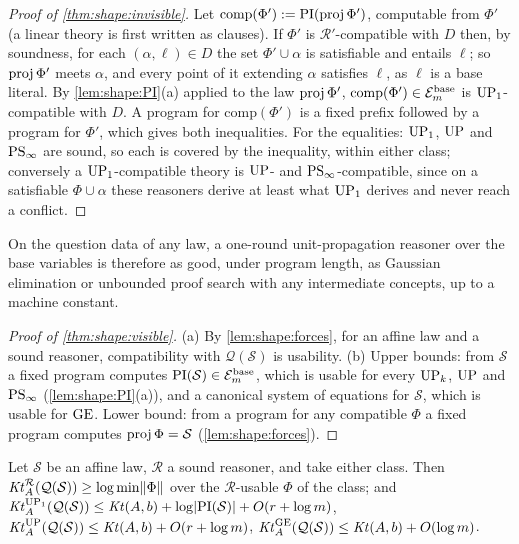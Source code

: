 \begin{proof}[Proof of \cref{thm:shape:invisible}]
Let $\mathrm{comp}(\Phi'):=\mathrm{PI}(\operatorname{proj}\Phi')$, computable from $\Phi'$ (a linear theory is first written as clauses). If $\Phi'$ is $\mathcal R'$-compatible with $D$ then, by soundness, for each $(\alpha,\ell)\in D$ the set $\Phi'\cup\alpha$ is satisfiable and entails $\ell$; so $\operatorname{proj}\Phi'$ meets $\alpha$, and every point of it extending $\alpha$ satisfies $\ell$, as $\ell$ is a base literal. By \cref{lem:shape:PI}(a) applied to the law $\operatorname{proj}\Phi'$, $\mathrm{comp}(\Phi')\in\mathcal E^{\rm base}_m$ is $\mathrm{UP}_1$-compatible with $D$. A program for $\mathrm{comp}(\Phi')$ is a fixed prefix followed by a program for $\Phi'$, which gives both inequalities. For the equalities: $\mathrm{UP}_1$, $\mathrm{UP}$ and $\mathrm{PS}_\infty$ are sound, so each is covered by the inequality, within either class; conversely a $\mathrm{UP}_1$-compatible theory is $\mathrm{UP}$- and $\mathrm{PS}_\infty$-compatible, since on a satisfiable $\Phi\cup\alpha$ these reasoners derive at least what $\mathrm{UP}_1$ derives and never reach a conflict.
\end{proof}

On the question data of any law, a one-round unit-propagation reasoner over the base variables is therefore as good, under program length, as Gaussian elimination or unbounded proof search with any intermediate concepts, up to a machine constant.

\begin{proof}[Proof of \cref{thm:shape:visible}]
(a) By \cref{lem:shape:forces}, for an affine law and a sound reasoner, compatibility with $\mathcal Q(\mathcal S)$ is usability.
(b) Upper bounds: from $\mathcal S$ a fixed program computes $\mathrm{PI}(\mathcal S)\in\mathcal E^{\rm base}_m$, which is usable for every $\mathrm{UP}_k$, $\mathrm{UP}$ and $\mathrm{PS}_\infty$ (\cref{lem:shape:PI}(a)), and a canonical system of equations for $\mathcal S$, which is usable for $\mathrm{GE}$. Lower bound: from a program for any compatible $\Phi$ a fixed program computes $\operatorname{proj}\Phi=\mathcal S$ (\cref{lem:shape:forces}).
\end{proof}

\begin{proposition}\label{prop:shape:timecharged}
Let $\mathcal S$ be an affine law, $\mathcal R$ a sound reasoner, and take either class. Then $\mathit{Kt}_{A}^{\mathcal R}(\mathcal Q(\mathcal S))\ge\log\min\lVert\Phi\rVert$ over the $\mathcal R$-usable $\Phi$ of the class; and $\mathit{Kt}_{A}^{\mathrm{UP}_1}(\mathcal Q(\mathcal S))\le\mathit{Kt}(A,b)+\log\lvert\mathrm{PI}(\mathcal S)\rvert+O(r+\log m)$, $\mathit{Kt}_{A}^{\mathrm{UP}}(\mathcal Q(\mathcal S))\le\mathit{Kt}(A,b)+O(r+\log m)$, $\mathit{Kt}_{A}^{\mathrm{GE}}(\mathcal Q(\mathcal S))\le\mathit{Kt}(A,b)+O(\log m)$.
\end{proposition}

